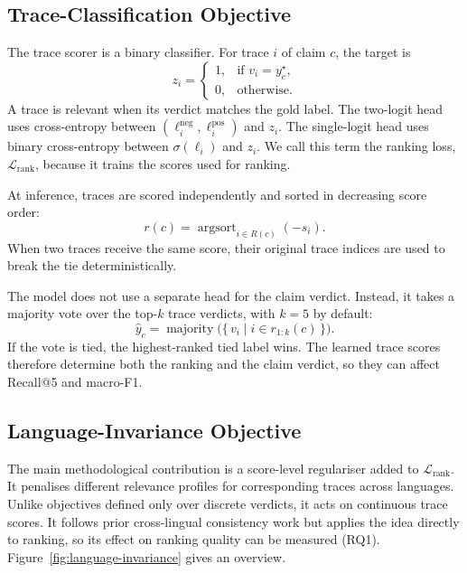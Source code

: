 \subsection{Trace-Classification Objective}
\label{subsec:method-objective}

The trace scorer is a binary classifier. For trace $i$ of claim $c$, the target is
\begin{equation}
\label{eq:label}
z_i=
\begin{cases}
1, & \text{if } v_i=y^\star_c,\\
0, & \text{otherwise.}
\end{cases}
\end{equation}
A trace is relevant when its verdict matches the gold label. The two-logit head uses cross-entropy
between $(\ell^{\text{neg}}_i,\ell^{\text{pos}}_i)$ and $z_i$. The single-logit head uses binary
cross-entropy between $\sigma(\ell_i)$ and $z_i$. We call this term the ranking loss,
$\mathcal{L}_{\text{rank}}$, because it trains the scores used for ranking.

At inference, traces are scored independently and sorted in decreasing score order:
\[
r(c)=\operatorname{argsort}_{i\in R(c)}(-s_i).
\]
When two traces receive the same score, their original trace indices are used to break the tie
deterministically.

The model does not use a separate head for the claim verdict. Instead, it takes a majority vote over
the top-$k$ trace verdicts, with $k=5$ by default:
\begin{equation}
\label{eq:verdict}
\hat{y}_c=
\operatorname{majority}
\bigl(\{\,v_i \mid i\in r_{1:k}(c)\,\}\bigr).
\end{equation}
If the vote is tied, the highest-ranked tied label wins. The learned trace scores therefore determine
both the ranking and the claim verdict, so they can affect Recall@5 and macro-F1.

\subsection{Language-Invariance Objective}
\label{subsec:method-invariance}

The main methodological contribution is a score-level regulariser added to
$\mathcal{L}_{\text{rank}}$. It penalises different relevance profiles for corresponding traces
across languages. Unlike objectives defined only over discrete verdicts, it acts on continuous trace
scores. It follows prior cross-lingual consistency work
\cite{zheng2021consistencyregularizationcrosslingualfinetuning,wang2025calmunleashingcrosslingualselfaligning,liu2026posttraininglanguagemodelscrosslingual}
but applies the idea directly to ranking, so its effect on ranking quality can be measured (RQ1).
Figure~\ref{fig:language-invariance} gives an overview.


